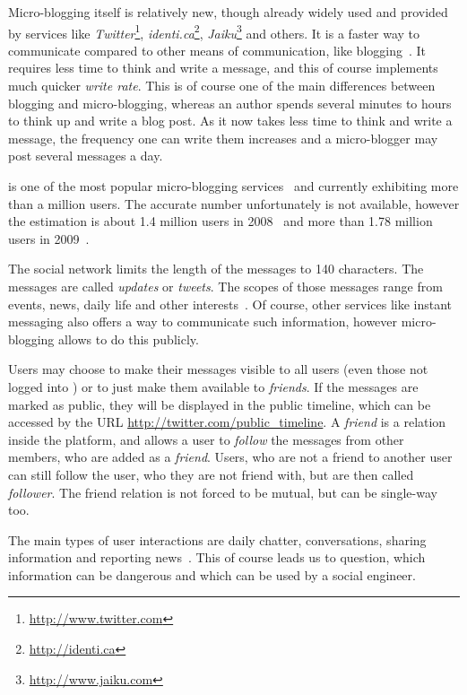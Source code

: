 Micro-blogging itself is relatively new, though already widely used and
provided by services like
\textit{Twitter}\footnote{\url{http://www.twitter.com}},
\textit{identi.ca}\footnote{\url{http://identi.ca}},
\textit{Jaiku}\footnote{\url{http://www.jaiku.com}} and others. It is a faster
way to communicate compared to other means of communication, like
blogging~\cite{java2007}. It requires less time to think and write a message,
and this of course implements much quicker \textit{write rate}. This is of
course one of the main differences between blogging and micro-blogging, whereas
an author spends several minutes to hours to think up and write a blog post. As
it now takes less time to think and write a message, the frequency one can
write them increases and a micro-blogger may post several messages a day.

\Twitter{} is one of the most popular micro-blogging services~\cite{java2007}
and currently exhibiting more than a million users. The accurate number
unfortunately is not available, however the estimation is about 1.4 million
users in 2008~\cite{krishnamurthy2008} and more than 1.78 million users in
2009~\cite{whitworth2009}.

The social network limits the length of the messages to 140 characters. The messages
are called \textit{updates} or \textit{tweets}. The scopes of those messages
range from events, news, daily life and other interests~\cite{java2007}. Of
course, other services like instant messaging also offers a way to communicate
such information, however micro-blogging allows to do this publicly.

Users may choose to make their messages visible to all users (even those not
logged into \Twitter{}) or to just make them available to \textit{friends}.
If the messages are marked as public, they will be displayed in
the public timeline, which can be accessed by the URL
\url{http://twitter.com/public_timeline}.
A \textit{friend} is a relation inside the \Twitter{} platform, and allows a user
to \textit{follow} the messages from other members, who are added as a
\textit{friend}. Users, who are not a friend to another user can still follow
the user, who they are not friend with, but are then called \textit{follower}.
The friend relation is not forced to be mutual, but can be single-way too.

The main types of user interactions are daily chatter, conversations, sharing
information and reporting news~\cite{java2007}. This of course leads us to
question, which information can be dangerous and which can be used by a social
engineer.

